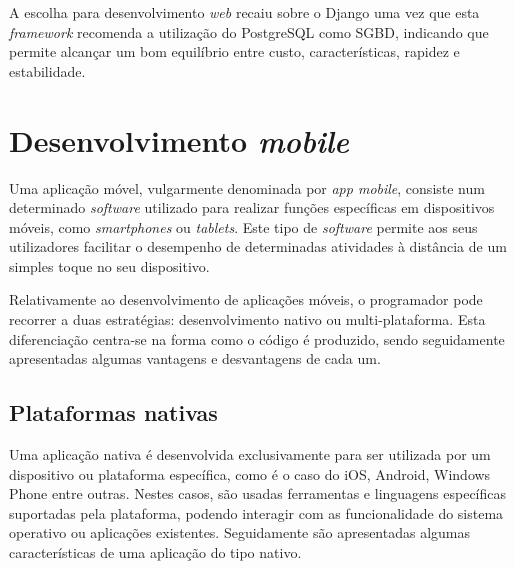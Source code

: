 A escolha para desenvolvimento \textit{web} recaiu sobre o Django uma vez que esta \textit{framework} recomenda a utilização do PostgreSQL como \ac{SGBD}, indicando que permite alcançar um bom equilíbrio entre custo, características, rapidez e estabilidade\cite{Holovaty2009}. 








\section{Desenvolvimento \textit{mobile}}


Uma aplicação móvel, vulgarmente denominada por \textit{app mobile}, consiste num determinado \textit{software} utilizado para realizar funções específicas em dispositivos móveis, como \textit{smartphones} ou \textit{tablets}. Este tipo de \textit{software} permite aos seus utilizadores facilitar o desempenho de determinadas atividades à distância de um simples toque no seu dispositivo. 

Relativamente ao desenvolvimento de aplicações móveis, o programador pode recorrer a duas estratégias: desenvolvimento nativo ou multi-plataforma. Esta diferenciação centra-se na forma como o código é produzido, sendo seguidamente apresentadas algumas  vantagens e desvantagens de cada um. 





\subsection{Plataformas nativas}

Uma aplicação nativa é desenvolvida exclusivamente para ser utilizada por um dispositivo ou plataforma específica, como é o caso do iOS, Android, Windows Phone entre outras. Nestes casos, são usadas ferramentas e linguagens específicas suportadas pela plataforma, podendo interagir com as funcionalidade do sistema operativo ou aplicações existentes. Seguidamente são apresentadas algumas características de uma aplicação do tipo nativo\cite{Ibm2012a}. 








